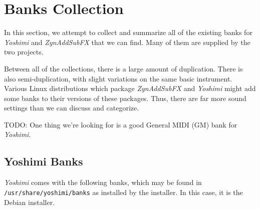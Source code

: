 %
%
%

\section{Banks Collection}
\label{sec:banks_collection}

   In this section, we attempt to collect and summarize all of the existing
   banks for \textsl{Yoshimi} and \textsl{ZynAddSubFX}
   that we can find.  Many of them
   are supplied by the two projects.

   Between all of the collections, there is a large amount of duplication.
   There is also semi-duplication, with slight variations on the same basic
   instrument.
   Various Linux distributions which package \textsl{ZynAddSubFX}
   and \textsl{Yoshimi}
   might add some banks to their versions of these packages.
   Thus, there are far more sound settings than we can discuss and categorize.

   TODO: One thing we're looking for is a good General MIDI (GM) bank for
   \textsl{Yoshimi}.

\subsection{Yoshimi Banks}
\label{subsec:banks_collection_yoshimi}

   \textsl{Yoshimi} comes with the following banks, which may be found in
   \texttt{/usr/share/yoshimi/banks} as installed by the installer.  In this
   case, it is the Debian installer.

